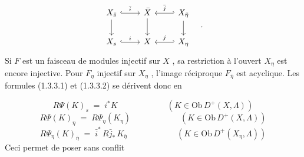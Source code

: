 \begin{equation}\notag
\begin{tikzcd}
X_{\bar{s}} \arrow[r, hook, "\bar{i}"] \arrow[d] & \bar{X} \arrow[d] & X_{\bar{\eta}} \arrow[l, hook', "\bar{j}"'] \arrow[d] \\
X_{s} \arrow[r, hook, "i"] & X & X_{\eta} \arrow[l, hook', "j"']
\end{tikzcd}\quad .
\end{equation}
Si $F$ est un faisceau de modules injectif sur $X$ , sa restriction à l'ouvert $X_{\eta}$ est encore injective. Pour $F_{\eta}$ injectif sur $X_{\eta}$ , l'image réciproque $F_{\bar{\eta}}$ est acyclique. Les formules (1.3.3.1) et (1.3.3.2) se dérivent donc en

\begin{equation}\tag{2.1.2.1}
R\Psi(K)_{s} \;=\; i^{*} K \qquad\qquad\qquad (K \in \mathrm{Ob}\, D^{+}(X, \Lambda))
\end{equation}
\begin{equation}\tag{2.1.2.2}
R\Psi(K)_{\eta} \;=\; R\Psi_{\eta}(K_{\eta}) \qquad\qquad\qquad (K \in \mathrm{Ob}\, D^{+}(X, \Lambda))
\end{equation}
\begin{equation}\tag{2.1.2.3}
R\Psi_{\eta}(K)_{\bar{\eta}} \;=\; \bar{i}^{*}\, R\bar{j}_{*}\, K_{\bar{\eta}} \qquad\qquad\qquad (K \in \mathrm{Ob}\, D^{+}(X_{\eta}, \Lambda))
\end{equation}
Ceci permet de poser sans conflit

